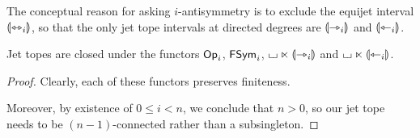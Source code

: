 \documentclass[a4paper]{memoir}
\begin{document}
The conceptual reason for asking $i$-antisymmetry is to exclude the equijet interval ${\llparenthesis {\leftrightarrowtriangle}_i \rrparenthesis}$, so that the only jet tope intervals at directed degrees are ${\llparenthesis {\rightarrowtriangle}_i \rrparenthesis}$ and ${\llparenthesis {\leftarrowtriangle}_i \rrparenthesis}$.
\begin{proposition} \label{thm:lift-to-jet-topes}
	Jet topes are closed under the functors ${\mathsf{Op}}_i$, $\mathsf{FSym}_i$,
	${\llcorner\hspace{-.4ex}\lrcorner} \ltimes {\llparenthesis \rightarrowtriangle_i \rrparenthesis}$ and ${\llcorner\hspace{-.4ex}\lrcorner} \ltimes {\llparenthesis \leftarrowtriangle_i \rrparenthesis}$.
\end{proposition}
\begin{proof}
	Clearly, each of these functors preserves finiteness.
	
	Moreover, by existence of $0 \leq i < n$, we conclude that $n > 0$, so our jet tope needs to be $(n-1)$-connected rather than a subsingleton.
	

\end{proof}
\end{document}
